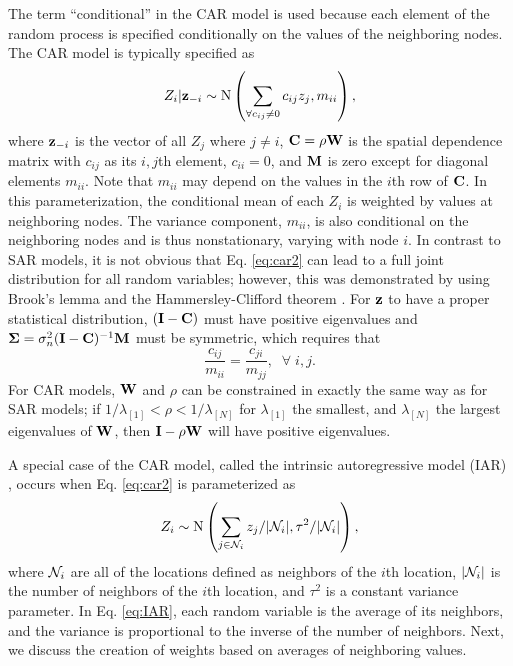 \documentclass[11pt, titlepage]{article}\usepackage[]{graphicx}\usepackage[]{color}
\begin{document}
\begin{spacing}{1.9}
\begin{flushleft}
The term ``conditional'' in the CAR model is used because each element of the random process is specified conditionally on the values of the neighboring nodes. The CAR model is typically specified as
\begin{equation}
				Z_i|\mathbf{z}_{-i} \sim \textrm{N}\left(\sum_{\forall c_{ij}\neq 0} c_{ij}z_j,m_{ii}\right),
  \label{eq:car2}
\end{equation}
where $\mathbf{z}_{-i}$ is the vector of all $Z_j$ where $j \ne i$, $\mathbf{C} =\rho\mathbf{W}$ is the spatial dependence matrix with $c_{ij}$ as its $i,j$th element, $c_{ii} = 0$, and $\mathbf{M}$ is zero except for diagonal elements $m_{ii}$. Note that $m_{ii}$ may depend on the values in the $i$th row of $\mathbf{C}$. In this parameterization, the conditional mean of each $Z_i$ is weighted by values at neighboring nodes. The variance component, $m_{ii}$, is also conditional on the neighboring nodes and is thus nonstationary, varying with node $i$.  In contrast to SAR models, it is not obvious that Eq. \ref{eq:car2} can lead to a full joint distribution for all random variables; however, this was demonstrated by \citet{Besa:spat:1974} using Brook's lemma \citep{Broo:dist:1964} and the Hammersley-Clifford theorem \citep{Hamm:Clif:Mark:1971,Clif:Mark:1990}. For $\mathbf{z}$ to have a proper statistical distribution, $(\mathbf{I}-\mathbf{C})$ must have positive eigenvalues and $\mbox{\boldmath $\Sigma$} = \sigma^2_n(\mathbf{I}-\mathbf{C})^{-1}\mathbf{M}$ must be symmetric, which requires that
\begin{equation} \label{eq:CarSymmetry}
				\frac{c_{ij}}{m_{ii}}=\frac{c_{ji}}{m_{jj}}, \; \; \forall \; i,j.
\end{equation}
For CAR models, $\mathbf{W}$ and $\rho$ can be constrained in exactly the same way as for SAR models; if $1/\lambda_{[1]} < \rho < 1/\lambda_{[N]}$ for $\lambda_{[1]}$ the smallest, and $\lambda_{[N]}$ the largest eigenvalues of $\mathbf{W}$, then $\mathbf{I} - \rho\mathbf{W}$ will have positive eigenvalues. 

A special case of the CAR model, called the intrinsic autoregressive model (IAR) \citep{Besa:Koop:cond:1995}, occurs when Eq. \ref{eq:car2} is parameterized as
\begin{equation} \label{eq:IAR}
 Z_i \sim \textrm{N}\left(\sum_{j \in \mathcal{N}_i} z_j/|\mathcal{N}_i|,\tau^2/|\mathcal{N}_i|\right),
\end{equation}
where $\mathcal{N}_i$ are all of the locations defined as neighbors of the $i$th location, $|\mathcal{N}_i|$ is the number of neighbors of the $i$th location, and $\tau^2$ is a constant variance parameter.  In Eq. \ref{eq:IAR}, each random variable is the average of its neighbors, and the variance is proportional to the inverse of the number of neighbors.  Next, we discuss the creation of weights based on averages of neighboring values.


\end{flushleft}
\end{spacing}
\end{document}
